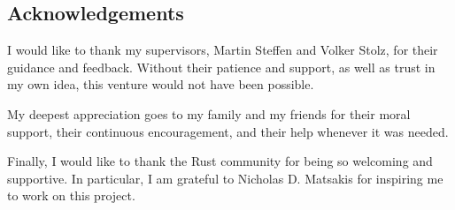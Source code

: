 \vspace*{2cm}
\thispagestyle{plain}

\begin{center}

{}

\section*{Acknowledgements}

\end{center}

I would like to thank my supervisors, Martin Steffen and Volker Stolz, for their guidance and feedback. Without their patience and support, as well as trust in my own idea, this venture would not have been possible.

My deepest appreciation goes to my family and my friends for their moral support, their continuous encouragement, and their help whenever it was needed.

Finally, I would like to thank the Rust community for being so welcoming and supportive. In particular, I am grateful to Nicholas D. Matsakis for inspiring me to work on this project.
